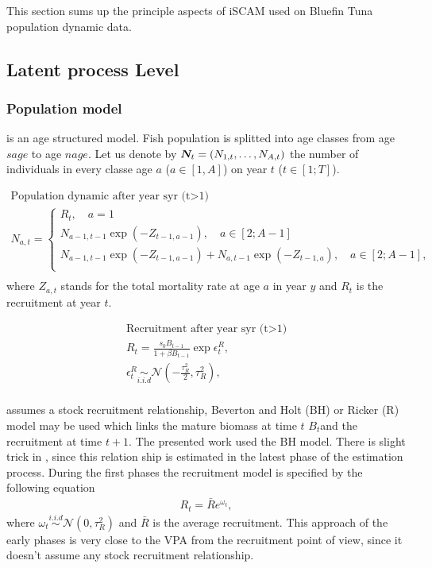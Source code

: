 This section  sums up the principle  aspects of iSCAM used  on Bluefin
Tuna population dynamic data.
\subsection{Latent process Level}
\subsubsection{Population model}
\iscam is an age structured model.  Fish population is splitted into age classes from
age $sage$ to age $nage$. Let us denote by $\boldsymbol N_t = (N_{1,t}, \ldots, N_{A,t})$ the number
of individuals in every classe age $a$ ($a\in [1,A]$) on year $t$ ($t\in [1;T]$).

\begin{gather}
  \mbox{Population dynamic after year syr (t>1)}\\
  N_{a,t}= \left\lbrace 
    \begin{array}{l}
      R_t, \quad a=1\\
      N_{a-1,t-1} \exp(-Z_{t-1, a-1}), \quad a\in [2;A-1]\\
      N_{a-1,t-1} \exp(-Z_{t-1, a-1}) + N_{a,t-1} \exp(-Z_{t-1, a}), \quad a\in [2;A-1],\\
    \end{array}  \right. \\
\end{gather}
 where $Z_{a,t}$  stands for the total  mortality rate at age  $a$ in
  year $y$ and $R_t$ is the recruitment at year $t$.




\begin{gather}
\mbox{Recruitment after year syr (t>1)}\\
R_t= \frac{s_0 B_{t-1}}{1+\beta B_{t-1}} \exp{\epsilon^R_t}, \\
\epsilon^R_t\underset{i.i.d}{\sim}\mathcal{N}\left(-\frac{\tau_R^2}{2}, \tau_R^2\right),\\
\end{gather} 

\iscam assumes a stock recruitment relationship, Beverton and Holt
(BH) or Ricker (R) model may be used which links the mature biomass at
time $t$ $B_t$and the recruitment at time $t+1$. The presented work used the BH model. 
There is slight trick in \iscam, since this relation ship is estimated
in the latest phase of the estimation process. During the first phases the recruitment
model is specified by the following equation
\begin{gather}
\label{eq:iscamRec}  R_t =\bar{R}e^{\omega_t},
\end{gather}
where  $\omega_t\overset{i.i.d}{\sim}  \mathcal{N}(0,  \tau^2_R)$  and
$\bar{R}$ is the average recruitment. This
approach  of the  early  phases is  very  close to  the  VPA from  the
recruitment  point  of  view,  since   it  doesn't  assume  any  stock
recruitment relationship. 



